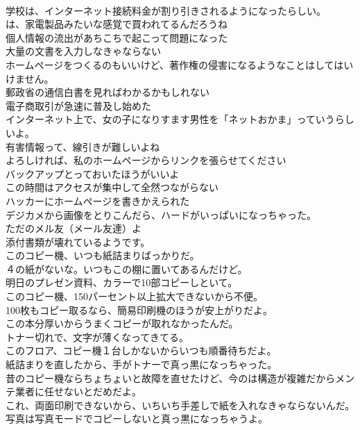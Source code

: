 \documentclass[8pt]{extreport}
\begin{document}
\begin{CJK}{UTF8}{min}
\\	学校は、インターネット接続料金が割り引きされるようになったらしい。	
\\	は、家電製品みたいな感覚で買われてるんだろうね	
\\	個人情報の流出があちこちで起こって問題になった	
\\	大量の文書を入力しなきゃならない	
\\	ホームページをつくるのもいいけど、著作権の侵害になるようなことはしてはいけません。	
\\	郵政省の通信白書を見ればわかるかもしれない	
\\	電子商取引が急速に普及し始めた	
\\	インターネット上で、女の子になりすます男性を「ネットおかま」っていうらしいよ。	
\\	有害情報って、線引きが難しいよね	
\\	よろしければ、私のホームページからリンクを張らせてください	
\\	バックアップとっておいたほうがいいよ	
\\	この時間はアクセスが集中して全然つながらない	
\\	ハッカーにホームページを書きかえられた	
\\	デジカメから画像をとりこんだら、ハードがいっぱいになっちゃった。	
\\	ただのメル友（メール友達）よ	
\\	添付書類が壊れているようです。	
\\	このコピー機、いつも紙詰まりばっかりだ。	
\\	４の紙がないな。いつもこの棚に置いてあるんだけど。	
\\	明日のプレゼン資料、カラーで10部コピーしといて。	
\\	このコピー機、150パーセント以上拡大できないから不便。	
\\	100枚もコピー取るなら、簡易印刷機のほうが安上がりだよ。	
\\	この本分厚いからうまくコピーが取れなかったんだ。	
\\	トナー切れで、文字が薄くなってきてる。	
\\	このフロア、コピー機１台しかないからいつも順番待ちだよ。	
\\	紙詰まりを直したから、手がトナーで真っ黒になっちゃった。	
\\	昔のコピー機ならちょちょいと故障を直せたけど、今のは構造が複雑だからメンテ業者に任せないとだめだよ。	
\\	これ、両面印刷できないから、いちいち手差しで紙を入れなきゃならないんだ。	
\\	写真は写真モードでコピーしないと真っ黒になっちゃうよ。	

\end{CJK}
\end{document}
